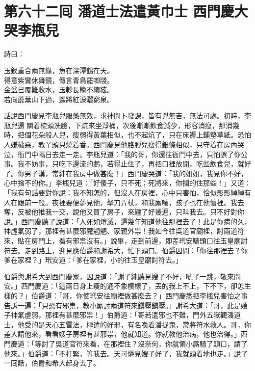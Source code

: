 
\chapter*{第六十二囘 潘道士法遣黃巾士 西門慶大哭李瓶兒}


詩曰：

\begin{myquote}
玉釵重合兩無緣，魚在深潭鶴在天。\\得意紫鸞休舞鏡，傳言青鳥罷啣牋。\\金盆已覆難收水，玉軫長籠不續絃。\\若向蘼蕪山下過，遙將紅淚灑窮泉。
\end{myquote}

話說西門慶見李瓶兒服藥無效，求神問卜發課，皆有兇無吉，無法可處。初時，李瓶兒還𨴃䦛着梳頭洗臉，下炕來坐淨桶，次後漸漸飲食減少，形容消瘦，那消幾時，把個花朵般人兒，瘦弱得黃葉相似，也不起炕了，只在床褥上鋪墊草紙。恐怕人嫌穢惡，教丫頭只燒着香。西門慶見他胳膊兒瘦得銀條相似，只守着在房內哭泣，衙門中隔日去走一走。李瓶兒道：「我的哥，你還往衙門中去，只怕誤了你公事。我不妨事，只吃下邊流的虧，若得止住了，再把口裡放開，吃些飲食兒，就好了。你男子漢，常絆在我房中做甚麼！」西門慶哭道：「我的姐姐，我見你不好，心中捨不的你。」李瓶兒道：「好傻子，只不死；死將來，你攔的住那些！」又道：「我有句話要對你說：我不知怎的，但沒人在房裡，心中只害怕，恰似影影綽綽有人在跟前一般。夜裡要便夢見他，拏刀弄杖，和我厮嚷，孩子也在他懷裡。我去奪，反被他推我一交，說他又買了房子，來纏了好幾遍，只叫我去。只不好對你說。」西門慶聽了說道：「人死如燈滅，這幾年知道他往那裡去了！此是你病的久，神虛氣弱了，那裡有甚麼邪魔魍魎、家親外祟！我如今往吳道官廟裡，討兩道符來，貼在房門上，看有邪祟沒有。」說畢，走到前邊，即差玳安騎頭口往玉皇廟討符去。走到路上，迎見應伯爵和謝希大，忙下頭口。伯爵因問：「你往那裡去？你爹在家裡？」玳安道：「爹在家裡，小的往玉皇廟討符去。」

伯爵與謝希大到西門慶家，因說道：「謝子純聽見嫂子不好，唬了一跳，敬來問安。」西門慶道：「這兩日身上瘦的通不象模樣了，丟的我上不上，下不下，卻怎生樣的？」伯爵道：「哥，你使玳安往廟裡做甚麼去？」西門慶悉把李瓶兒害怕之事告訴一遍：「只恐有邪祟，教小厮討兩道符來鎭壓鎭壓。」謝希大道：「哥，此是嫂子神氣虛弱，那裡有甚麼邪祟！」伯爵道：「哥若遣邪也不難，門外五嶽觀潘道士，他受的是天心五雷法，極遣的好邪，有名喚着潘捉鬼，常將符水救人。哥，你差人請他來，看看嫂子房裡有甚邪祟，他就知道。你就教他治病，他也治得。」西門慶道：「等討了吳道官符來看，在那裡住？沒奈何，你就領小厮騎了頭口，請了他來。」伯爵道：「不打緊，等我去。天可憐見嫂子好了，我就頭着地也走。」{}說了一囘話，伯爵和希大起身去了。

